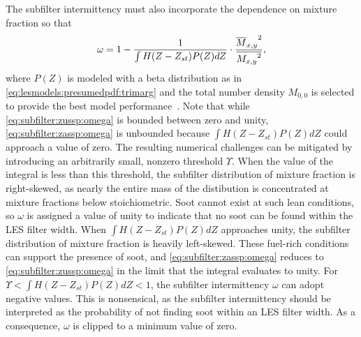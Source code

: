 The subfilter intermittency must also incorporate the dependence on mixture fraction so that
\begin{equation}\label{eq:subfilter:zassp:omega}
  \omega = 1 - \frac{1}{\int H(Z - Z_{st})P(Z)dZ} \cdot \frac{{\overline{M}_{x,y}}^2}{\overline{{M_{x,y}}^2}},
\end{equation}
where $P(Z)$ is modeled with a beta distribution as in \cref{eq:lesmodels:presumedpdf:trimarg} and the total number density $M_{0,0}$ is selected to provide the best model performance~\cite{subfilterpdf2011}. Note that while \cref{eq:subfilter:zussp:omega} is bounded between zero and unity, \cref{eq:subfilter:zassp:omega} is unbounded because $\int H(Z - Z_{st})P(Z)dZ$ could approach a value of zero. The resulting numerical challenges can be mitigated by introducing an arbitrarily small, nonzero threshold $\Upsilon$. When the value of the integral is less than this threshold, the subfilter distribution of mixture fraction is right-skewed, as nearly the entire mass of the distibution is concentrated at mixture fractions below stoichiometric. Soot cannot exist at such lean conditions, so $\omega$ is assigned a value of unity to indicate that no soot can be found within the LES filter width. When $\int H(Z - Z_{st})P(Z)dZ$ approaches unity, the subfilter distribution of mixture fraction is heavily left-skewed. These fuel-rich conditions can support the presence of soot, and \cref{eq:subfilter:zassp:omega} reduces to \cref{eq:subfilter:zussp:omega} in the limit that the integral evaluates to unity. For $\Upsilon < \int H(Z - Z_{st})P(Z)dZ < 1$, the subfilter intermittency $\omega$ can adopt negative values. This is nonsensical, as the subfilter intermittency should be interpreted as the probability of not finding soot within an LES filter width. As a consequence, $\omega$ is clipped to a minimum value of zero.

